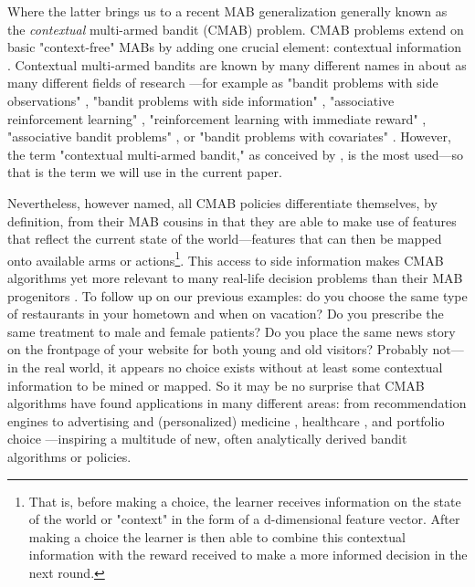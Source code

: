 \documentclass{jss}
\begin{document}
Where the latter brings us to a recent MAB generalization generally known as the \textit{contextual} multi-armed bandit (CMAB) problem. CMAB problems extend on basic "context-free" MABs by adding one crucial element: contextual information \citep{Langford2008}. Contextual multi-armed bandits are known by many different names in about as many different fields of research \citep{Tewari2017}---for example as "bandit problems with side observations" \citep{Wang2005a}, "bandit problems with side information" \citep{Lu2010}, "associative reinforcement learning" \citep{Kaelbling1996}, "reinforcement learning with immediate reward" \citep{Abe2003}, "associative bandit problems" \citep{Strehl2006}, or "bandit problems with covariates" \citep{Sarkar1991}. However, the term "contextual multi-armed bandit," as conceived by \cite{Langford2008}, is the most used---so that is the term we will use in the current paper.

Nevertheless, however named, all CMAB policies differentiate themselves, by definition, from their MAB cousins in that they are able to make use of features that reflect the current state of the world---features that can then be mapped onto available arms or actions\footnote{That is, before making a choice, the learner receives information on the state of the world or "context" in the form of a d-dimensional feature vector. After making a choice the learner is then able to combine this contextual information with the reward received to make a more informed decision in the next round.}. This access to side information makes CMAB algorithms yet more relevant to many real-life decision problems than their MAB progenitors \citep{Langford2008}. To follow up on our previous examples: do you choose the same  type of restaurants in your hometown and when on vacation? Do you prescribe the same treatment to male and female patients? Do you place the same news story on the frontpage of your website for both young and old visitors? Probably not---in the real world, it appears no choice exists without at least some contextual information to be mined or mapped. So it may be no surprise that CMAB algorithms have found applications in many different areas: from recommendation engines \citep{Lai1985} to advertising \citep{Tang2013} and (personalized) medicine \citep{Katehakis1986,Tewari2017}, healthcare \citep{Rabbi2015}, and portfolio choice \citep{Shen2015}---inspiring a multitude of new, often analytically derived bandit algorithms or policies.
\end{document}
